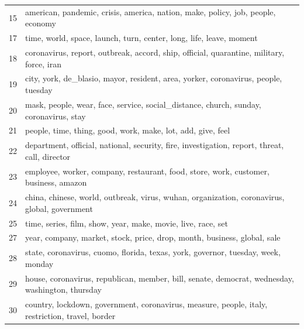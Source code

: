 \documentclass[11pt]{article}
\begin{document}
\begin{table}[ht]
\begin{small}
\begin{tabular}{c|l}
15          & american, pandemic, crisis, america, nation, make, policy, job, people, economy                         \\
17          & time, world, space, launch, turn, center, long, life, leave, moment                                     \\
18          & coronavirus, report, outbreak, accord, ship, official, quarantine, military, force, iran                \\
19          & city, york, de\_blasio, mayor, resident, area, yorker, coronavirus, people, tuesday                     \\
20          & mask, people, wear, face, service, social\_distance, church, sunday, coronavirus, stay                  \\
21          & people, time, thing, good, work, make, lot, add, give, feel                                             \\
22          & department, official, national, security, fire, investigation, report, threat, call, director           \\
23          & employee, worker, company, restaurant, food, store, work, customer, business, amazon                    \\
24          & china, chinese, world, outbreak, virus, wuhan, organization, coronavirus, global, government            \\
25          & time, series, film, show, year, make, movie, live, race, set                                            \\
27          & year, company, market, stock, price, drop, month, business, global, sale                                \\
28          & state, coronavirus, cuomo, florida, texas, york, governor, tuesday, week, monday                        \\
29          & house, coronavirus, republican, member, bill, senate, democrat, wednesday, washington, thursday         \\
30          & country, lockdown, government, coronavirus, measure, people, italy, restriction, travel, border         \\

\end{tabular}
\end{small}
\end{table}
\end{document}
